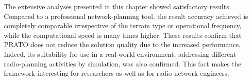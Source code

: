 The extensive analyses presented in this chapter showed satisfactory
results. Compared to a professional network-planning tool, the result
accuracy achieved is completely comparable irrespective of the terrain
type or operational frequency, while the computational speed is many
times higher. These results confirm that PRATO does not reduce the
solution quality due to the increased performance. Indeed, its suitability
for use in a real-world environment, addressing different radio-planning
activities by simulation, was also confirmed. This fact makes the
framework interesting for researchers as well as for radio-network
engineers.
